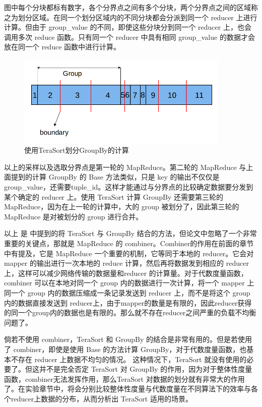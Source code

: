 图中每个分块都标有数字，各个分界点之间有多个分块，两个分界点之间的区域称之为划分区域。在同一个划分区域内的不同分块都会分派到同一个 reducer 上进行计算。但由于 group\_value 的不同，即使这些分块分到同一个 reducer 上，也会调用多次 reduce 函数。只有同一个 reducer 中具有相同 group\_value 的数据才会放在同一个 reduce 函数中进行计算。

\begin{figure}[!ht] 
\centering\includegraphics[width=4in]{picture/ch_terasort_mr/ts_groupby} 
\caption{使用TeraSort划分GroupBy的计算}\label{ts_groupby} 
\end{figure}

以上的采样以及选取分界点是第一轮的 MapReduce。第二轮的 MapReduce 与上面提到的计算 GroupBy 的 Base 方法类似，只是 key 的输出不仅仅是 group\_value，还需要tuple\_id。这样才能通过与分界点的比较确定数据要分发到某个确定的 reducer 上。使用 TeraSort 计算 GroupBy 还需要第三轮的 MapReduce，因为在上一轮的计算中，大的 group 被划分了，因此第三轮的 MapReduce 是对被划分的 group 进行合并。

以上 是 \cite{tao2013minimal} 中提到的将 TeraSort 与 GroupBy 结合的方法，但论文中忽略了一个非常重要的关键点，那就是 MapReduce 的 combiner。Combiner的作用在前面的章节中有提及，它是 MapReduce 一个重要的机制，它等同于本地的 reducer。它会对 mapper 的输出进行一次本地的 reduce 计算，然后再将数据发到相应的 reducer 上，这样可以减少网络传输的数据量和reducer 的计算量。对于代数度量函数，combiner 可以在本地对同一个 group 内的数据进行一次计算，将一个 mapper 上同一个 group 内的数据压缩成一条记录发送到 reducer 上，而不是将这个 group 内的数据直接发送到 reducer上，由于mapper的数量是有限的，因此reducer获得的同一个group内的数据也是有限的。那么就不存在reducer之间严重的负载不均衡问题了。

倘若不使用 combiner，TeraSort 和 GroupBy 的结合是非常有用的。但是若使用了 combiner，即使是使用 Base 的方法计算 GroupBy，对于代数度量函数，也基本不存在 reducer 上数据不均匀的情况。 这种情况下，TeraSort 就没有使用的必要了。但这并不是完全否定 TeraSort 对 GroupBy 的作用，因为对于整体性度量函数，combiner无法发挥作用，那么TeraSort 对数据的划分就有非常大的作用了。在实验章节中，将会分别比较整体性度量与代数度量在不同算法下的效率与各个reducer上数据的分布，从而分析出 TeraSort 适用的场景。


